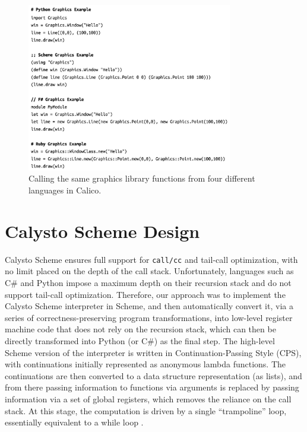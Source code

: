 \documentclass[acmsmall,screen,anonymous,review]{acmart}
\begin{document}

\begin{figure}
  \includegraphics[width=0.8\textwidth]{graphics-scripts.jpg}
  \caption{Calling the same graphics library functions from four different languages in Calico.}
  \label{fig:scripts}
  \Description{}
\end{figure}


\section{Calysto Scheme Design}

Calysto Scheme ensures full support for \texttt{call/cc} and tail-call
optimization, with no limit placed on the depth of the call stack.
Unfortunately, languages such as C\# and Python impose a maximum depth on their
recursion stack and do not support tail-call optimization.  Therefore, our
approach was to implement the Calysto Scheme interpreter in Scheme, and then
automatically convert it, via a series of correctness-preserving program
transformations, into low-level register machine code that does not rely on the
recursion stack, which can then be directly transformed into Python (or C\#) as
the final step.  The high-level Scheme version of the interpreter is written in
Continuation-Passing Style (CPS), with continuations initially represented as
anonymous lambda functions.  The continuations are then converted to a data
structure representation (as lists), and from there passing information to
functions via arguments is replaced by passing information via a set of global
registers, which removes the reliance on the call stack.  At this stage, the
computation is driven by a single ``trampoline'' loop, essentially equivalent
to a while loop \cite{Ganz99, EOPL3}.
\end{document}
